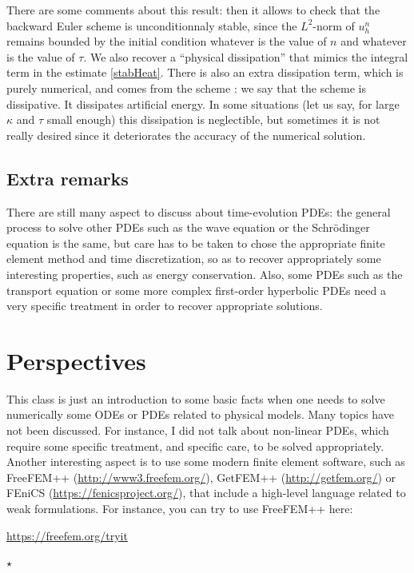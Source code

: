 \documentclass{article}
\begin{document}
\medskip

There are some comments about this result: then it allows to check that the backward Euler scheme is unconditionnaly stable, since the $L^2$-norm of $u_h^n$ remains bounded by the initial condition whatever is the value of $n$ and whatever is the value of $\tau$. We also recover a ``physical dissipation'' that mimics the integral term in the estimate \eqref{stabHeat}. There is also an extra dissipation term, which is purely numerical, and comes from the scheme : we say that the scheme is dissipative. It dissipates artificial energy. In some situations (let us say, for large $\kappa$ and $\tau$ small enough) this dissipation is neglectible, but sometimes it is not really desired since it deteriorates the accuracy of the numerical solution.

\subsection{Extra remarks}

There are still many aspect to discuss about time-evolution PDEs: the general process to solve other PDEs such as the wave equation or the Schrödinger equation is the same, but care has to be taken to chose the appropriate finite element method and time discretization, so as to recover appropriately some interesting properties, such as energy conservation. Also, some PDEs such as the transport equation or some more complex first-order hyperbolic PDEs need a very specific treatment in order to recover appropriate solutions.

\newpage

\section{Perspectives}

This class is just an introduction to some basic facts when one needs to solve numerically some ODEs or PDEs related to physical models. Many topics have not been discussed. For instance, I did not talk about non-linear PDEs, which require some specific treatment, and specific care, to be solved appropriately.
%
Another interesting aspect is to use some modern finite element software, such as FreeFEM++ (\url{http://www3.freefem.org/}), GetFEM++ (\url{http://getfem.org/}) or FEniCS (\url{https://fenicsproject.org/}), that include a high-level language related to weak formulations. For instance, you can try to use FreeFEM++ here:

\begin{center}
    \url{https://freefem.org/tryit}
\end{center}

\begin{center}
   $\star$
\end{center}

\newpage



\end{document}
